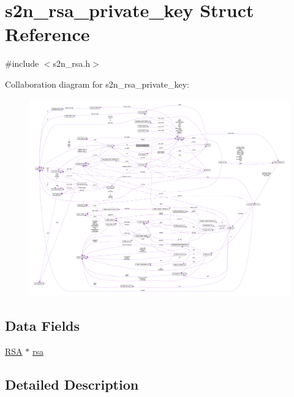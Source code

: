 \hypertarget{structs2n__rsa__private__key}{}\section{s2n\+\_\+rsa\+\_\+private\+\_\+key Struct Reference}
\label{structs2n__rsa__private__key}


{\ttfamily \#include $<$s2n\+\_\+rsa.\+h$>$}



Collaboration diagram for s2n\+\_\+rsa\+\_\+private\+\_\+key\+:\nopagebreak
\begin{figure}[H]
\begin{center}
\leavevmode
\includegraphics[width=350pt]{structs2n__rsa__private__key__coll__graph}
\end{center}
\end{figure}
\subsection*{Data Fields}
\begin{DoxyCompactItemize}
\item 
\hyperlink{crypto_2ossl__typ_8h_a9ad4496a11f0a9f686bea793cb97f8b5}{R\+SA} $\ast$ \hyperlink{structs2n__rsa__private__key_abe5e4dd8049eff80d7e599d751f143f8}{rsa}
\end{DoxyCompactItemize}


\subsection{Detailed Description}


